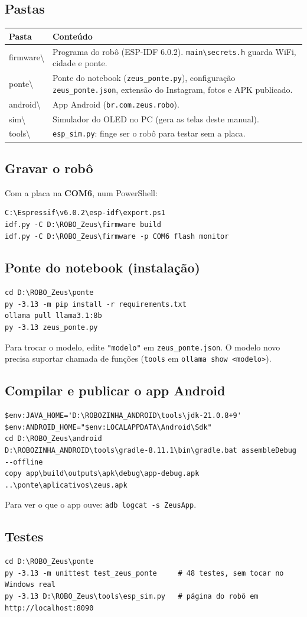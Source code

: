 \documentclass[11pt,a4paper]{article}
\newcommand{\bs}{\textbackslash\allowbreak}
\begin{document}
\subsection{Pastas}
\begin{tabularx}{\linewidth}{@{}>{\ttfamily}l X@{}}
\toprule
\textbf{\rmfamily Pasta} & \textbf{Conteúdo} \\ \midrule
firmware\bs{}& Programa do robô (ESP-IDF 6.0.2). \texttt{main\bs{}secrets.h} guarda WiFi, cidade e ponte. \\
ponte\bs{}& Ponte do notebook (\texttt{zeus\_ponte.py}), configuração \texttt{zeus\_ponte.json}, extensão do Instagram, fotos e APK publicado. \\
android\bs{}& App Android (\texttt{br.com.zeus.robo}). \\
sim\bs{}& Simulador do OLED no PC (gera as telas deste manual). \\
tools\bs{}& \texttt{esp\_sim.py}: finge ser o robô para testar sem a placa. \\
\bottomrule
\end{tabularx}

\subsection{Gravar o robô}
Com a placa na \textbf{COM6}, num PowerShell:
\begin{verbatim}
C:\Espressif\v6.0.2\esp-idf\export.ps1
idf.py -C D:\ROBO_Zeus\firmware build
idf.py -C D:\ROBO_Zeus\firmware -p COM6 flash monitor
\end{verbatim}

\subsection{Ponte do notebook (instalação)}
\begin{verbatim}
cd D:\ROBO_Zeus\ponte
py -3.13 -m pip install -r requirements.txt
ollama pull llama3.1:8b
py -3.13 zeus_ponte.py
\end{verbatim}
Para trocar o modelo, edite \texttt{"modelo"} em \texttt{zeus\_ponte.json}. O modelo novo
precisa suportar chamada de funções (\texttt{tools} em \texttt{ollama show <modelo>}).

\subsection{Compilar e publicar o app Android}
\begin{verbatim}
$env:JAVA_HOME='D:\ROBOZINHA_ANDROID\tools\jdk-21.0.8+9'
$env:ANDROID_HOME="$env:LOCALAPPDATA\Android\Sdk"
cd D:\ROBO_Zeus\android
D:\ROBOZINHA_ANDROID\tools\gradle-8.11.1\bin\gradle.bat assembleDebug --offline
copy app\build\outputs\apk\debug\app-debug.apk ..\ponte\aplicativos\zeus.apk
\end{verbatim}
Para ver o que o app ouve: \texttt{adb logcat -s ZeusApp}.

\subsection{Testes}
\begin{verbatim}
cd D:\ROBO_Zeus\ponte
py -3.13 -m unittest test_zeus_ponte     # 48 testes, sem tocar no Windows real
py -3.13 D:\ROBO_Zeus\tools\esp_sim.py   # página do robô em http://localhost:8090
\end{verbatim}
\end{document}

